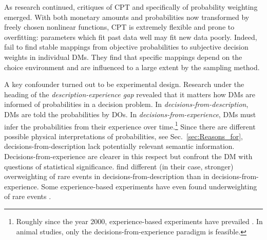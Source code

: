 \documentclass[a4paper, 12pt]{article}
\newcommand{\seclabel}[1]{\label{sec:#1}}
\newcommand{\secref}[1]{Sec.~\ref{sec:#1}}
\begin{document}
As research continued, critiques of CPT and specifically of probability weighting emerged. With both monetary amounts and probabilities now transformed by freely chosen nonlinear functions, CPT is extremely flexible and prone to overfitting: parameters which fit past data well may fit new data poorly. Indeed, \textcite{StewartETAL2015} fail to find stable mappings from objective probabilities to subjective decision weights in individual DMs. They find that specific mappings depend on the choice environment and are influenced to a large extent by the sampling method.

A key confounder turned out to be experimental design. Research under the heading of the \textit{description-experience gap} revealed that it matters how DMs are informed of probabilities in a decision problem. In \textit{decisions-from-description}, DMs are told the probabilities by DOs. In \textit{decisions-from-experience}, DMs must infer the probabilities from their experience over time.\footnote{Roughly since the year 2000, experience-based experiments have prevailed \parencite{HertwigETAL2004,HertwigErev2009,ErevETAL2010}. In animal studies, only the decisions-from-experience paradigm is feasible.} Since there are different possible physical interpretations of probabilities, see \secref{Reasons_for}, decisions-from-description lack potentially relevant semantic information. Decisions-from-experience are clearer in this respect but confront the DM with questions of statistical significance. \textcite{HertwigETAL2004} find different (in their case, stronger) overweighting of rare events in decisions-from-description than in decisions-from-experience. Some experience-based experiments have even found underweighting of rare events \parencites{UngemachETAL2009}[see esp. Tab. 9]{WulffETAL2018}.
\end{document}
